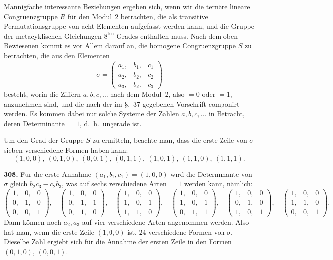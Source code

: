 \documentclass[12pt,a4paper]{article}
\begin{document}
Mannigfache interessante Beziehungen ergeben sich, wenn wir die tern\"are lineare Congruenzgruppe $R$ f\"ur den Modul~2 betrachten, die als transitive Permutationsgruppe von acht Elementen aufgefasst werden kann, und die Gruppe der metacyklischen Gleichungen $8^{\text{ten}}$ Grades enthalten muss. Nach dem oben Bewiesenen kommt es vor Allem darauf an, die homogene Congruenzgruppe $S$ zu betrachten, die aus den Elementen
\begin{equation}
\tag{1}
\sigma =
\begin{pmatrix}
a_1, & b_1, & c_1\\
a_2, & b_2, & c_2\\
a_3, & b_3, & c_3
\end{pmatrix}
\end{equation}
besteht, worin die Ziffern $a,b,c,\ldots$ nach dem Modul~2, also $=0$ oder $=1$, anzunehmen sind, und die nach der im \S.~37 gegebenen Vorschrift componirt werden. Es kommen dabei nur solche Systeme der Zahlen $a,b,c,\ldots$ in Betracht, deren Determinante $=1$, d.~h.\ ungerade ist.

Um den Grad der Gruppe $S$ zu ermitteln, beachte man, dass die erste Zeile von $\sigma$ sieben verschiedene Formen haben kann:
\[
(1,0,0),\ (0,1,0),\ (0,0,1),\ (0,1,1),\ (1,0,1),\ (1,1,0),\ (1,1,1).
\]

\bigskip
\noindent\textbf{308.} F\"ur die erste Annahme $(a_1,b_1,c_1)=(1,0,0)$ wird die Determinante von $\sigma$ gleich $b_2 c_3 - c_2 b_3$, was auf sechs verschiedene Arten $=1$ werden kann, n\"amlich:
\[
\begin{pmatrix} 1,& 0,& 0\\ 0,& 1,& 0\\ 0,& 0,& 1\end{pmatrix},\quad
\begin{pmatrix} 1,& 0,& 0\\ 0,& 1,& 1\\ 0,& 1,& 0\end{pmatrix},\quad
\begin{pmatrix} 1,& 0,& 0\\ 1,& 0,& 1\\ 1,& 1,& 0\end{pmatrix},\quad
\begin{pmatrix} 1,& 0,& 0\\ 1,& 0,& 1\\ 0,& 1,& 1\end{pmatrix},\quad
\begin{pmatrix} 1,& 0,& 0\\ 0,& 1,& 0\\ 1,& 0,& 1\end{pmatrix},\quad
\begin{pmatrix} 1,& 0,& 0\\ 1,& 1,& 0\\ 0,& 0,& 1\end{pmatrix}.
\]
Dann k\"onnen noch $a_2,a_3$ auf vier verschiedene Arten angenommen werden. Also hat man, wenn die erste Zeile $(1,0,0)$ ist, $24$ verschiedene Formen von $\sigma$. Dieselbe Zahl ergiebt sich f\"ur die Annahme der ersten Zeile in den Formen $(0,1,0)$, $(0,0,1)$.
\end{document}
